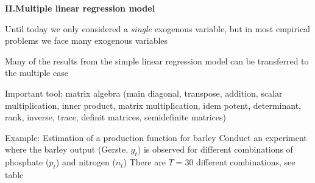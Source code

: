 \documentclass{article}
\begin{document}
\newpage

\textbf{\Large II.\quad  Multiple linear regression model}


Until today we only considered a \emph{single} exogenous variable, but
in most empirical problems we face many exogenous variables

Many of the results from the simple linear regression model can be
transferred to the multiple case

Important tool: matrix algebra\newline
(main diagonal, transpose, addition, scalar multiplication, inner product,
matrix multiplication, idem potent, determinant, rank, inverse, trace,
definit matrices, semidefinite matrices)

Example: Estimation of a production function for barley
Conduct an experiment where the barley output (Gerste, $g_{t}$) is
observed for different combinations of phosphate ($p_{t}$) and nitrogen ($%
n_{t}$)
There are $T=30$ different combinations, see table
\end{document}
